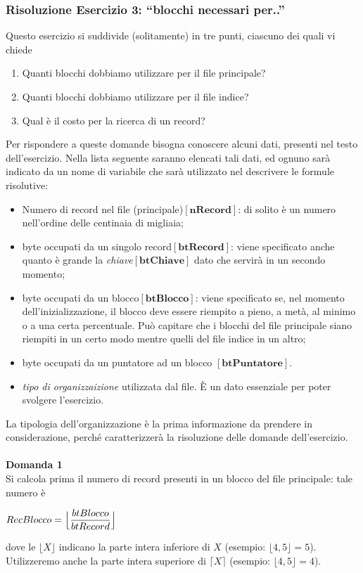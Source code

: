 \subsubsection{Risoluzione Esercizio 3: ``blocchi necessari per..''}
Questo esercizio si suddivide (solitamente) in tre punti, ciascuno dei quali vi chiede
\begin{enumerate}
\item Quanti blocchi dobbiamo utilizzare per il file principale? 
\item Quanti blocchi dobbiamo utilizzare per il file indice?
\item Qual è il costo per la ricerca di un record? 
\end{enumerate}

Per rispondere a queste domande bisogna conoscere alcuni dati, presenti nel testo dell'esercizio. Nella lista 
seguente saranno elencati tali dati, ed ognuno sarà indicato da un nome di variabile che sarà utilizzato nel 
descrivere le formule risolutive:

\begin{itemize}
 \item Numero di record nel file (principale)$[\mathbf{nRecord}]$: di solito è un numero nell'ordine delle centinaia 
 di migliaia;
 \item byte occupati da un singolo record$[\mathbf{btRecord}]$: viene specificato anche quanto è grande la \emph{chiave}$[\mathbf{btChiave}]$
 dato che servirà in un secondo momento;
 \item byte occupati da un blocco$[\mathbf{btBlocco}]$: viene specificato se, nel momento dell'inizializzazione, 
 il blocco deve essere riempito a pieno, a metà, al minimo o a una certa percentuale. Può capitare
 che i blocchi del file principale siano riempiti in un certo modo mentre quelli del file indice in 
 un altro;
 \item byte occupati da un puntatore ad un blocco $[\mathbf{btPuntatore}]$.
 \item \emph{tipo di organizzaizione} utilizzata dal file. \`E un dato essenziale per poter svolgere
 l'esercizio.
\end{itemize}
La tipologia dell'organizzazione è la prima informazione da prendere in considerazione, perché caratterizzerà
la risoluzione delle domande dell'esercizio.\\\\

\noindent\textbf{\fontsize{14pt}{1em}Domanda 1}\\
Si calcola prima il numero di record presenti in un blocco del file principale: tale numero è
\begin{center}
$RecBlocco = \Bigl\lfloor \dfrac{btBlocco}{btRecord} \Bigr\rfloor$
\end{center}
dove le $\bigl\lfloor X \bigr\rfloor$ indicano la parte intera inferiore di $X$ (esempio: $\bigl\lfloor 4,5 
\bigr\rfloor = 5$). Utilizzeremo anche la parte intera superiore di $\bigl\lceil X \bigr\rceil$ (esempio: $\bigl\lfloor 4,5 
\bigr\rfloor = 4$).\\

